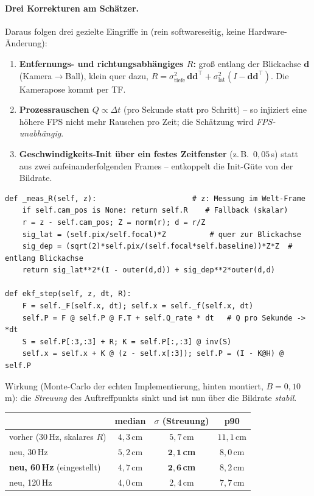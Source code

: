 \paragraph{Drei Korrekturen am Schätzer.} Daraus folgen drei gezielte Eingriffe in
 (rein softwareseitig, keine Hardware-Änderung):
\begin{enumerate}
\item \textbf{Entfernungs- und richtungsabhängiges $R$:} groß entlang der
  Blickachse $\mathbf d$ (Kamera$\rightarrow$Ball), klein quer dazu,
  $R=\sigma_{\text{tiefe}}^2\,\mathbf d\mathbf d^\top
   +\sigma_{\text{lat}}^2(I-\mathbf d\mathbf d^\top)$. Die Kamerapose kommt per TF.
\item \textbf{Prozessrauschen $Q\propto\Delta t$} (pro Sekunde statt pro Schritt) --
  so injiziert eine höhere FPS nicht mehr Rauschen pro Zeit; die Schätzung wird
  \emph{FPS-unabhängig}.
\item \textbf{Geschwindigkeits-Init über ein festes Zeitfenster} (z.\,B.\
  $0{,}05\,$s) statt aus zwei aufeinanderfolgenden Frames -- entkoppelt die
  Init-Güte von der Bildrate.
\end{enumerate}
\begin{lstlisting}[style=py,caption={\code{flight\_ekf} -- entfernungsabhängiges $R$ und $Q\propto\Delta t$}]
def _meas_R(self, z):                      # z: Messung im Welt-Frame
    if self.cam_pos is None: return self.R    # Fallback (skalar)
    r = z - self.cam_pos; Z = norm(r); d = r/Z
    sig_lat = (self.pix/self.focal)*Z          # quer zur Blickachse
    sig_dep = (sqrt(2)*self.pix/(self.focal*self.baseline))*Z*Z  # entlang Blickachse
    return sig_lat**2*(I - outer(d,d)) + sig_dep**2*outer(d,d)

def ekf_step(self, z, dt, R):
    F = self._F(self.x, dt); self.x = self._f(self.x, dt)
    self.P = F @ self.P @ F.T + self.Q_rate * dt   # Q pro Sekunde -> *dt
    S = self.P[:3,:3] + R; K = self.P[:,:3] @ inv(S)
    self.x = self.x + K @ (z - self.x[:3]); self.P = (I - K@H) @ self.P
\end{lstlisting}
\noindent Wirkung (Monte-Carlo der echten Implementierung, hinten montiert,
$B=0{,}10\,$m): die \emph{Streuung} des Auftreffpunkts sinkt und ist nun über die
Bildrate \emph{stabil}.
\begin{center}\small
\begin{tabular}{lccc}
\toprule
 & median & $\sigma$ (Streuung) & p90 \\
\midrule
vorher (30\,Hz, skalares $R$)        & $4{,}3\,$cm & $5{,}7\,$cm & $11{,}1\,$cm \\
neu, 30\,Hz                          & $5{,}2\,$cm & $\mathbf{2{,}1\,}$\textbf{cm} & $8{,}0\,$cm \\
\textbf{neu, 60\,Hz} (eingestellt)   & $4{,}7\,$cm & $\mathbf{2{,}6\,}$\textbf{cm} & $8{,}2\,$cm \\
neu, 120\,Hz                         & $4{,}0\,$cm & $2{,}4\,$cm & $7{,}7\,$cm \\
\bottomrule
\end{tabular}
\end{center}
